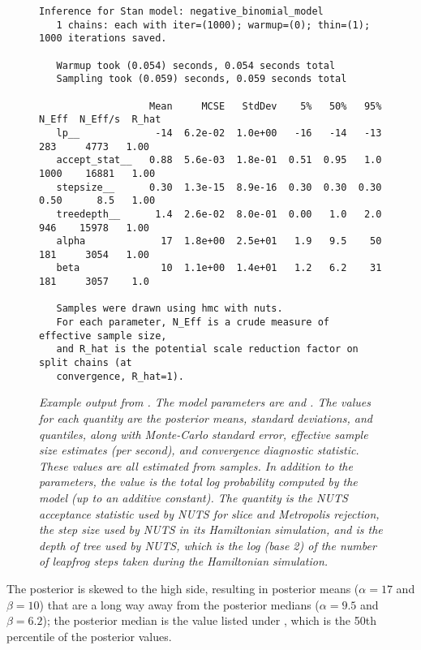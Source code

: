 \begin{figure}
\begin{Verbatim}[fontsize=\footnotesize]
   Inference for Stan model: negative_binomial_model
   1 chains: each with iter=(1000); warmup=(0); thin=(1); 1000 iterations saved.

   Warmup took (0.054) seconds, 0.054 seconds total
   Sampling took (0.059) seconds, 0.059 seconds total

                   Mean     MCSE   StdDev    5%   50%   95%  N_Eff  N_Eff/s  R_hat
   lp__             -14  6.2e-02  1.0e+00   -16   -14   -13    283     4773   1.00
   accept_stat__   0.88  5.6e-03  1.8e-01  0.51  0.95   1.0   1000    16881   1.00
   stepsize__      0.30  1.3e-15  8.9e-16  0.30  0.30  0.30   0.50      8.5   1.00
   treedepth__      1.4  2.6e-02  8.0e-01  0.00   1.0   2.0    946    15978   1.00
   alpha             17  1.8e+00  2.5e+01   1.9   9.5    50    181     3054   1.00
   beta              10  1.1e+00  1.4e+01   1.2   6.2    31    181     3057    1.0

   Samples were drawn using hmc with nuts.
   For each parameter, N_Eff is a crude measure of effective sample size,
   and R_hat is the potential scale reduction factor on split chains (at 
   convergence, R_hat=1).\end{Verbatim}
\vspace*{-6pt}
\caption{\small\it Example output from .  The model
  parameters are  and .  The values for each
  quantity are the posterior means, standard deviations, and
  quantiles, along with Monte-Carlo standard error, effective sample
  size estimates (per second), and convergence diagnostic statistic.
  These values are all estimated from samples. In addition to the
  parameters, the value  is the total log probability
  computed by the model (up to an additive constant).  The quantity
   is the NUTS acceptance statistic used by
  NUTS for slice and Metropolis rejection,  the
  step size used by NUTS in its Hamiltonian simulation, and
   is the depth of tree used by NUTS, which is the
  log (base 2) of the number of leapfrog steps taken during the
  Hamiltonian simulation.  }\label{bin-print-eg.figure}
\end{figure}
%
The posterior is skewed to the high side, resulting in posterior means
($\alpha=17$ and $\beta=10$) that are a long way away from the posterior
medians ($\alpha=9.5$ and $\beta=6.2$);  the posterior median is the
value listed under , which is the 50th percentile of the
posterior values.

